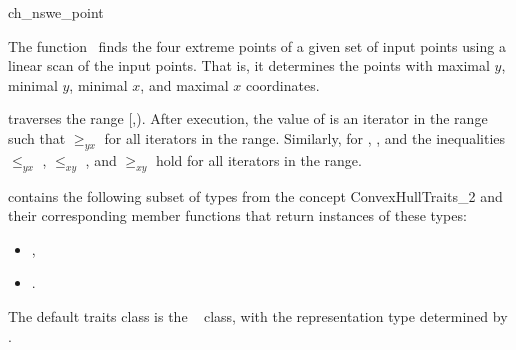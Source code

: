 

\begin{ccRefFunction}{ch_nswe_point}  %

\ccDefinition
  
The function \ccRefName\ finds the four extreme points of a given set  
of input points using a linear scan of the input points.  
That is, it determines the points with maximal $y$, minimal $y$,
minimal $x$, and maximal $x$ coordinates.


           {traverses the range [,).
            After execution, the value of
             is an iterator in the range such that  $\ge_{yx}$
             for all iterators  in the range. Similarly, for
            , , and  the inequalities  $\le_{yx}$
            ,  $\le_{xy}$ , and 
            $\ge_{xy}$  hold for all iterators
             in the range.}


 contains the following subset of types from
the concept ConvexHullTraits\_2 and their corresponding member
functions that return instances of these types:
            \begin{itemize}
                \item {}, 
                \item {}.
            \end{itemize}

The default traits class  is the \cgal\ 
 class,
with the representation type determined by .



\end{ccRefFunction}
